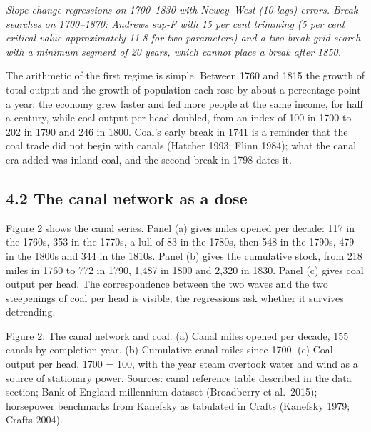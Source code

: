 \documentclass[
  11pt,
]{article}
\begin{document}
\emph{Slope-change regressions on 1700--1830 with Newey--West (10 lags)
errors. Break searches on 1700--1870: Andrews sup-F with 15 per cent
trimming (5 per cent critical value approximately 11.8 for two
parameters) and a two-break grid search with a minimum segment of 20
years, which cannot place a break after 1850.}

The arithmetic of the first regime is simple. Between 1760 and 1815 the
growth of total output and the growth of population each rose by about a
percentage point a year: the economy grew faster and fed more people at
the same income, for half a century, while coal output per head doubled,
from an index of 100 in 1700 to 202 in 1790 and 246 in 1800. Coal's
early break in 1741 is a reminder that the coal trade did not begin with
canals (Hatcher 1993; Flinn 1984); what the canal era added was inland
coal, and the second break in 1798 dates it.

\subsection{4.2 The canal network as a
dose}\label{the-canal-network-as-a-dose-1}

Figure 2 shows the canal series. Panel (a) gives miles opened per
decade: 117 in the 1760s, 353 in the 1770s, a lull of 83 in the 1780s,
then 548 in the 1790s, 479 in the 1800s and 344 in the 1810s. Panel (b)
gives the cumulative stock, from 218 miles in 1760 to 772 in 1790, 1,487
in 1800 and 2,320 in 1830. Panel (c) gives coal output per head. The
correspondence between the two waves and the two steepenings of coal per
head is visible; the regressions ask whether it survives detrending.

Figure 2: The canal network and coal. (a) Canal miles opened per decade,
155 canals by completion year. (b) Cumulative canal miles since 1700.
(c) Coal output per head, 1700 = 100, with the year steam overtook water
and wind as a source of stationary power. Sources: canal reference table
described in the data section; Bank of England millennium dataset
(Broadberry et al.~2015); horsepower benchmarks from Kanefsky as
tabulated in Crafts (Kanefsky 1979; Crafts 2004).
\end{document}
